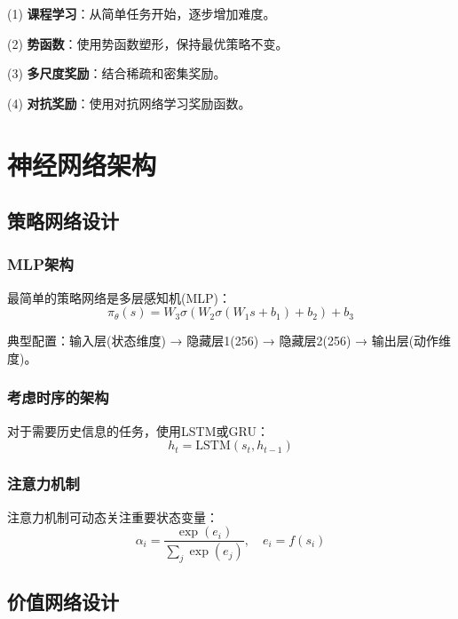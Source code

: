(1) \textbf{课程学习}：从简单任务开始，逐步增加难度。

(2) \textbf{势函数}：使用势函数塑形，保持最优策略不变。

(3) \textbf{多尺度奖励}：结合稀疏和密集奖励。

(4) \textbf{对抗奖励}：使用对抗网络学习奖励函数。

\section{神经网络架构}\label{sec:network_architecture}

\subsection{策略网络设计}

\subsubsection{MLP架构}

最简单的策略网络是多层感知机(MLP)：
\begin{equation}
\pi_\theta(s) = W_3\sigma(W_2\sigma(W_1s + b_1) + b_2) + b_3
\end{equation}

典型配置：输入层(状态维度) → 隐藏层1(256) → 隐藏层2(256) → 输出层(动作维度)。

\subsubsection{考虑时序的架构}

对于需要历史信息的任务，使用LSTM或GRU：
\begin{equation}
h_t = \text{LSTM}(s_t, h_{t-1})
\end{equation}

\subsubsection{注意力机制}

注意力机制可动态关注重要状态变量：
\begin{equation}
\alpha_i = \frac{\exp(e_i)}{\sum_j \exp(e_j)}, \quad e_i = f(s_i)
\end{equation}

\subsection{价值网络设计}

